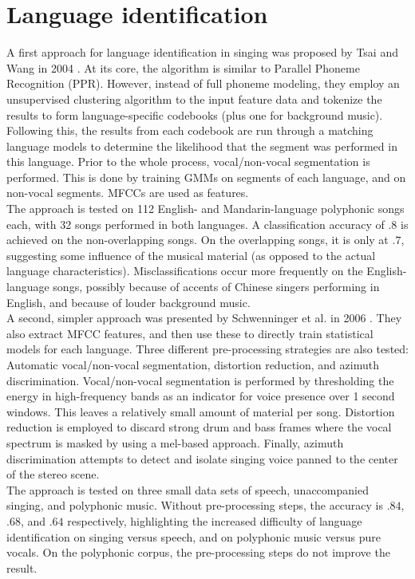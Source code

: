 \section{Language identification}
A first approach for language identification in singing was proposed by Tsai and Wang in 2004 \cite{tsai_wang}. At its core, the algorithm is similar to Parallel Phoneme Recognition (PPR). However, instead of full phoneme modeling, they employ an unsupervised clustering algorithm to the input feature data and tokenize the results to form language-specific codebooks (plus one for background music). Following this, the results from each codebook are run through a matching language models to determine the likelihood that the segment was performed in this language. Prior to the whole process, vocal/non-vocal segmentation is performed. This is done by training GMMs on segments of each language, and on non-vocal segments. MFCCs are used as features.\\
The approach is tested on 112 English- and Mandarin-language polyphonic songs each, with 32 songs performed in both languages. A classification accuracy of $.8$ is achieved on the non-overlapping songs. On the overlapping songs, it is only at $.7$, suggesting some influence of the musical material (as opposed to the actual language characteristics). Misclassifications occur more frequently on the English-language songs, possibly because of accents of Chinese singers performing in English, and because of louder background music.\\

A second, simpler approach was presented by Schwenninger et al. in 2006 \cite{schwenninger}. They also extract MFCC features, and then use these to directly train statistical models for each language. Three different pre-processing strategies are also tested: Automatic vocal/non-vocal segmentation, distortion reduction, and azimuth discrimination. Vocal/non-vocal segmentation is performed by thresholding the energy in high-frequency bands as an indicator for voice presence over 1 second windows. This leaves a relatively small amount of material per song. Distortion reduction is employed to discard strong drum and bass frames where the vocal spectrum is masked by using a mel-based approach. Finally, azimuth discrimination attempts to detect and isolate singing voice panned to the center of the stereo scene.\\
The approach is tested on three small data sets of speech, unaccompanied singing, and polyphonic music. Without pre-processing steps, the accuracy is $.84$, $.68$, and $.64$ respectively, highlighting the increased difficulty of language identification on singing versus speech, and on polyphonic music versus pure vocals. On the polyphonic corpus, the pre-processing steps do not improve the result.\\

